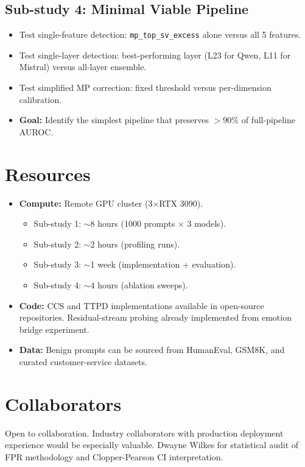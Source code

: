 \documentclass[11pt,letterpaper]{article}
\begin{document}
\subsection{Sub-study 4: Minimal Viable Pipeline}

\begin{itemize}
  \item Test single-feature detection: \texttt{mp\_top\_sv\_excess} alone
    versus all 5 features.
  \item Test single-layer detection: best-performing layer (L23 for Qwen,
    L11 for Mistral) versus all-layer ensemble.
  \item Test simplified MP correction: fixed threshold versus
    per-dimension calibration.
  \item \textbf{Goal:} Identify the simplest pipeline that preserves
    $> 90\%$ of full-pipeline AUROC.
\end{itemize}

\section{Resources}

\begin{itemize}
  \item \textbf{Compute:} Remote GPU cluster (3$\times$RTX 3090).
    \begin{itemize}
      \item Sub-study 1: $\sim$8 hours (1000 prompts $\times$ 3 models).
      \item Sub-study 2: $\sim$2 hours (profiling runs).
      \item Sub-study 3: $\sim$1 week (implementation + evaluation).
      \item Sub-study 4: $\sim$4 hours (ablation sweeps).
    \end{itemize}
  \item \textbf{Code:} CCS and TTPD implementations available in
    open-source repositories. Residual-stream probing already implemented
    from emotion bridge experiment.
  \item \textbf{Data:} Benign prompts can be sourced from HumanEval,
    GSM8K, and curated customer-service datasets.
\end{itemize}

\section{Collaborators}

Open to collaboration. Industry collaborators with production deployment
experience would be especially valuable. Dwayne Wilkes for statistical
audit of FPR methodology and Clopper-Pearson CI interpretation.
\end{document}
